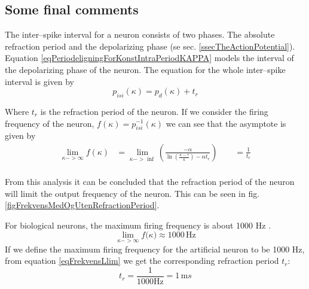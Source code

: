 



\subsection{Some final comments}
\label{ssecValueOfAlpha}

The inter--spike interval for a neuron consists of two phases. 
The absolute refraction period and the depolarizing phase (se sec. \ref{ssecTheActionPotential}).
Equation \eqref{eqPeriodeligningForKonstIntraPeriodKAPPA} models the interval of the depolarizing phase of the neuron. %
The equation for the whole inter--spike interval is given by
\begin{equation}
	p_{isi}(\kappa) = p_d(\kappa) + t_r
	\label{eqHeilePerioden}
\end{equation}

Where $t_r$ is the refraction period of the neuron. %
If we consider the firing frequency of the neuron, $f(\kappa) = p_{isi}^{-1}(\kappa)$ we can see that the asymptote is given by
\begin{equation}
	\begin{split}
		\lim_{\kappa->\infty}{ f(\kappa)} &= \lim_{\kappa->\inf}\left( \frac{-\alpha}{\ln \left( \frac{\kappa - \tau}{\kappa} \right) - \alpha t_r} \right)   \qquad = \frac{1}{t_r} \\ 
	\end{split}
	\label{eqFrekvensLlim} 
\end{equation}

From this analysis it can be concluded that the refraction period of the neuron will limit the output frequency of the neuron.
This can be seen in fig. \ref{figFrekvensMedOgUtenRefractionPeriod}.

For biological neurons, the maximum firing frequency is about 1000 Hz \cite{NeuroscienceExploringTheBrain3edKAP4}. %
\begin{equation}
	\lim_{\kappa->\infty}{ f(\kappa}) \approx 1000 \, \text{Hz}
\end{equation}
If we define the maximum firing frequency for the artificial neuron to be 1000 Hz, from equation \ref{eqFrekvensLlim} we get the corresponding refraction period $t_r$:
\begin{equation}
	t_r = \frac{1}{1000 \text{Hz}} = 1 \, \text{m}s %
\end{equation}

